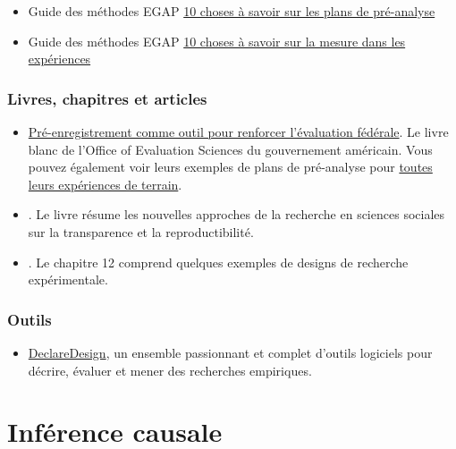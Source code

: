 \documentclass[
  12pt,
]{book}
\providecommand{\tightlist}{%
  \setlength{\itemsep}{0pt}\setlength{\parskip}{0pt}}
\begin{document}
\begin{itemize}
\item
  Guide des méthodes EGAP \href{https://egap.org/resource/10-things-to-know-about-pre-analysis-plans/}{10 choses à savoir sur les plans de pré-analyse}
\item
  Guide des méthodes EGAP \href{https://egap.org/resource/10-things-to-know-about-measurement-in-experiments/}{10 choses à savoir sur la mesure dans les expériences}
\end{itemize}

\hypertarget{livres-chapitres-et-articles}{%
\subsection{Livres, chapitres et articles}\label{livres-chapitres-et-articles}}

\begin{itemize}
\item
  \href{https://oes.gsa.gov/assets/files/preregistration-as-a-tool-in-federal-evaluation.pdf}{Pré-enregistrement comme outil pour renforcer l'évaluation fédérale}. Le livre blanc de l'Office of Evaluation Sciences du gouvernement américain. Vous pouvez également voir leurs exemples de plans de pré-analyse pour \href{https://oes.gsa.gov/work/}{toutes leurs expériences de terrain}.
\item
  \autocite{christensen_transparent_2019}. Le livre résume les nouvelles approches de la recherche en sciences sociales sur la transparence et la reproductibilité.
\item
  \autocite{gerber_field_2012}. Le chapitre 12 comprend quelques exemples de designs de recherche expérimentale.
\end{itemize}

\hypertarget{outils}{%
\subsection{Outils}\label{outils}}

\begin{itemize}
\tightlist
\item
  \href{https://declaredesign.org/}{DeclareDesign}, un ensemble passionnant et complet d'outils logiciels pour décrire, évaluer et mener des recherches empiriques.
\end{itemize}

\hypertarget{infuxe9rence-causale}{%
\chapter{Inférence causale}\label{infuxe9rence-causale}}
\end{document}
